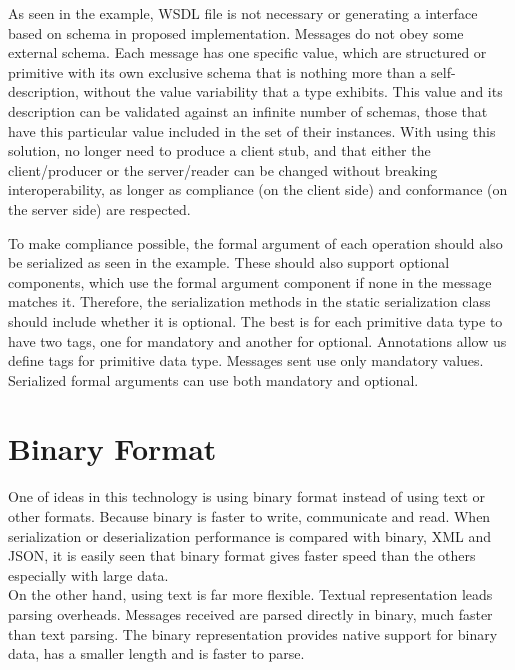 As seen in the example, WSDL file is not necessary or generating a interface based on schema in proposed implementation. Messages do not obey some external schema. Each message has one specific value, which are structured or primitive with its own exclusive schema that is nothing more than a self-description, without the value variability that a type exhibits. This value and its description can be validated against an infinite number of schemas, those that have this particular value included in the set of their instances. With using this solution, no longer need to produce a client stub, and that either the client/producer or the server/reader can be changed without breaking interoperability, as longer as compliance (on the client side) and conformance (on the server side) are respected.

To make compliance possible, the formal argument of each operation should also be serialized as seen in the example. These should also support optional components, which use the formal argument component if none in the message matches it. Therefore, the serialization methods in the static serialization class should include whether it is optional. The best is for each primitive data type to have two tags, one for mandatory and another for optional. Annotations allow us define tags for primitive data type. Messages sent use only mandatory values. Serialized formal arguments can use both mandatory and optional.

\section{Binary Format}
\label{section:binary}

One of ideas in this technology is using binary format instead of using text or other formats. Because binary is faster to write, communicate and read. When serialization or deserialization performance is compared with binary, XML and JSON, it is easily seen that binary format gives faster speed than the others especially with large data\citep{binary:2016:Online}.\\

On the other hand, using text is far more flexible. Textual representation leads parsing overheads. Messages received are parsed directly in binary, much faster than text parsing. The binary representation provides native support for binary data, has a smaller length and is faster to parse.

